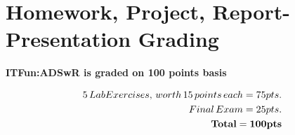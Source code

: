 \documentclass[11pt]{article} %
\begin{document}
\section{Homework, Project, Report-Presentation Grading}

  
 
  {\bf ITFun:ADSwR is graded on 100 points basis}
 
  \begin{align*}
    5 \, Lab Exercises, \, worth \, 15 \, points \, each = 75 pts. \\
    Final \, Exam = 25 pts. \\
    {\bf Total = 100 pts}
  \end{align*}
  
  
\end{document}
